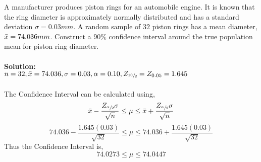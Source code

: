 \documentclass{book}
\begin{document}
A manufacturer produces piston rings for an automobile engine. It is known that the ring diameter is approximately normally distributed and has a standard deviation $\sigma = 0.03 mm$. A random sample of $32$ piston rings has a mean diameter, $\Bar{x} = 74.036 mm$. Construct a $90\%$ confidence interval around the true population mean for piston ring diameter.\\\\
    \textbf{Solution:}\\
    $n=32,\\
    \Bar{x}=74.036,\\
    \sigma=0.03,\\
    \alpha=0.10,\\
    Z_{\sfrac{10}{2}}=Z_{0.05}=1.645$\\\\
    The Confidence Interval can be calculated using,
    \begin{equation*}
        \Bar{x}-\frac{Z_{\sfrac{\alpha}{2}}\sigma}{\sqrt{n}} \leq \mu \leq \Bar{x}+\frac{Z_{\sfrac{\alpha}{2}}\sigma}{\sqrt{n}}
    \end{equation*}
    \begin{equation*}
        74.036 - \frac{1.645(0.03)}{\sqrt{32}} \leq \mu \leq 74.036 + \frac{1.645(0.03)}{\sqrt{32}}
    \end{equation*}
    Thus the Confidence Interval is,
    \begin{equation*}
        74.0273 \leq \mu \leq 74.0447
    \end{equation*}
\end{document}
